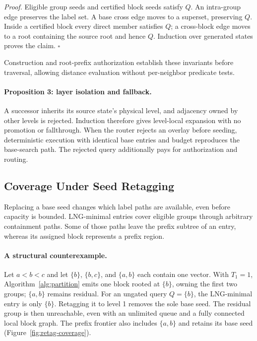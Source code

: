 \emph{Proof.} Eligible group seeds and certified block seeds satisfy $Q$.
An intra-group edge preserves the label set.  A base cross edge moves to a
superset, preserving $Q$.  Inside a certified block every direct member
satisfies $Q$; a cross-block edge moves to a root containing the source root
and hence $Q$.  Induction over generated states proves the claim. \hfill$\square$

Construction and root-prefix authorization establish these invariants
before traversal, allowing distance evaluation without per-neighbor
predicate tests.

\paragraph{Proposition 3: layer isolation and fallback.}
A successor inherits its source state's physical level, and adjacency owned
by other levels is rejected.  Induction therefore gives level-local
expansion with no promotion or fallthrough.  When the router rejects an
overlay before seeding, deterministic execution with identical base entries
and budget reproduces the base-search path.  The rejected query additionally pays for authorization and routing.

\subsection{Coverage Under Seed Retagging}
\label{sec:retag-coverage}
Replacing a base seed changes which label paths are available, even before
capacity is bounded. LNG-minimal entries cover eligible groups through
arbitrary containment paths. Some of those paths leave the prefix subtree
of an entry, whereas its assigned block represents a prefix region.

\paragraph{A structural counterexample.}
Let $a<b<c$ and let $\{b\}$, $\{b,c\}$, and $\{a,b\}$ each contain one
vector. With $T_1=1$, Algorithm~\ref{alg:partition} emits one block rooted
at $\{b\}$, owning the first two groups; $\{a,b\}$ remains residual.
For an ungated query $Q=\{b\}$, the LNG-minimal entry is only $\{b\}$. Retagging it to
level 1 removes the sole base seed. The residual group is then unreachable,
even with an unlimited queue and a fully connected local block graph.
The prefix frontier also includes $\{a,b\}$ and retains its base seed
(Figure~\ref{fig:retag-coverage}).

